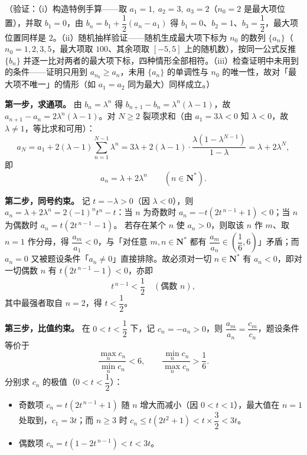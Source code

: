 \begin{answer}
（验证：（i）构造特例手算——取 \(a_{1}=1,\ a_{2}=3,\ a_{3}=2\)（\(n_{0}=2\) 是最大项位置），并取 \(b_{1}=0\)，由 \(b_{n}=b_{1}+\dfrac{1}{2}(a_{n}-a_{1})\) 得 \(b_{1}=0\)、\(b_{2}=1\)、\(b_{3}=\dfrac{1}{2}\)，最大项位置同样是 \(2\)。（ii）随机抽样验证——随机生成最大项下标为 \(n_{0}\) 的数列 \(\{a_{n}\}\)（\(n_{0}=1,2,3,5\)，最大项取 \(100\)、其余项取 \([-5,5]\) 上的随机数），按同一公式反推 \(\{b_{n}\}\) 并逐一比对两者的最大项下标，四种情形全部相符。（iii）检查证明中未用到的条件——证明只用到 \(a_{n_{0}}\geqslant a_{n}\)，未用 \(\{a_{n}\}\) 的单调性与 \(n_{0}\) 的唯一性，故对「最大项不唯一」的情形（如 \(a_{1}=a_{2}\) 同为最大）同样成立。）


\textbf{第一步，求通项。} 由 \(b_{n}=\lambda^{n}\) 得 \(b_{n+1}-b_{n}=\lambda^{n}(\lambda-1)\)，故 \(a_{n+1}-a_{n}=2\lambda^{n}(\lambda-1)\)。对 \(N\geqslant2\) 裂项求和（由 \(a_{1}=3\lambda<0\) 知 \(\lambda<0\)，故 \(\lambda\neq1\)，等比求和可用）：
\nopagebreak[4]
\[
a_{N}=a_{1}+2(\lambda-1)\sum_{n=1}^{N-1}\lambda^{n}=3\lambda+2(\lambda-1)\cdot\frac{\lambda\left(1-\lambda^{N-1}\right)}{1-\lambda}=\lambda+2\lambda^{N},
\]
即
\nopagebreak[4]
\[
a_{n}=\lambda+2\lambda^{n}\qquad(n\in\mathbf{N}^{*}).
\]

\textbf{第二步，同号约束。} 记 \(t=-\lambda>0\)（因 \(\lambda<0\)），则 \(a_{n}=\lambda+2\lambda^{n}=2(-1)^{n}t^{n}-t\)：当 \(n\) 为奇数时 \(a_{n}=-t\left(2t^{\,n-1}+1\right)<0\)；当 \(n\) 为偶数时 \(a_{n}=t\left(2t^{\,n-1}-1\right)\)。
若存在某个 \(n\) 使 \(a_{n}>0\)，则取该 \(n\) 作 \(m\)、取 \(n=1\) 作分母，得 \(\dfrac{a_{m}}{a_{1}}<0\)，与「对任意 \(m,n\in\mathbf{N}^{*}\) 都有 \(\dfrac{a_{m}}{a_{n}}\in\left(\dfrac{1}{6},6\right)\)」矛盾；而 \(a_{n}=0\) 又被题设条件「\(a_{n}\neq0\)」直接排除。故必须对一切 \(n\in\mathbf{N}^{*}\) 有 \(a_{n}<0\)，即对一切偶数 \(n\) 有 \(t\left(2t^{\,n-1}-1\right)<0\)，亦即
\nopagebreak[4]
\[
t^{\,n-1}<\frac{1}{2}\quad(\text{偶数 }n),
\]
其中最强者取自 \(n=2\)，得 \(t<\dfrac{1}{2}\)。

\textbf{第三步，比值约束。} 在 \(0<t<\dfrac{1}{2}\) 下，记 \(c_{n}=-a_{n}>0\)，则 \(\dfrac{a_{m}}{a_{n}}=\dfrac{c_{m}}{c_{n}}\)，题设条件等价于
\nopagebreak[4]
\[
\frac{\max\limits_{n}c_{n}}{\min\limits_{n}c_{n}}<6,\qquad \frac{\min\limits_{n}c_{n}}{\max\limits_{n}c_{n}}>\frac{1}{6}.
\]
分别求 \(c_{n}\) 的极值（\(0<t<\dfrac{1}{2}\)）：

\begin{itemize}
\item 奇数项 \(c_{n}=t\left(2t^{\,n-1}+1\right)\) 随 \(n\) 增大而减小（因 \(0<t<1\)），最大值在 \(n=1\) 处取到，\(c_{1}=3t\)；而 \(n\geqslant3\) 时 \(c_{n}\leqslant t\left(2t^{2}+1\right)<t\times\dfrac{3}{2}<3t\)。
\item 偶数项 \(c_{n}=t\left(1-2t^{\,n-1}\right)<t<3t\)。
\end{itemize}


\end{answer}
